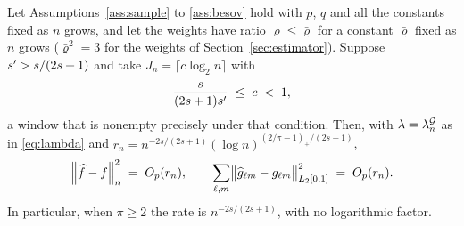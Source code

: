 \begin{theorem}
\label{thm:main}
Let Assumptions~\ref{ass:sample} to \ref{ass:besov} hold with $p$, $q$ and all
the constants fixed as $n$ grows, and let the weights have ratio
$\varrho \le \bar\varrho$ for a constant $\bar\varrho$ fixed as $n$ grows
($\bar\varrho^{2} = 3$ for the weights of Section~\ref{sec:estimator}). Suppose
$s' > s/(2s+1)$ and take $J_n = \lceil c \log_2 n\rceil$ with
\begin{equation}
  \label{eq:window}
  \frac{s}{(2s+1)s'} \;\le\; c \;<\; 1 ,
\end{equation}
a window that is nonempty precisely under that condition. Then, with
$\lambda = \lambda^{\mathcal{G}}_{n}$ as in \eqref{eq:lambda} and
$r_n = n^{-2s/(2s+1)}(\log n)^{(2/\pi-1)_{+}/(2s+1)}$,
\[
  \left\lVert \widehat{f}-f \right\rVert_{n}^{2} \;=\; O_p(r_n),
  \qquad
  \sum_{\ell,m}\bigl\lVert \widehat{g}_{\ell m}-g_{\ell m}
  \bigr\rVert_{L_2[0,1]}^{2} \;=\; O_p(r_n) .
\]
In particular, when $\pi \ge 2$ the rate is $n^{-2s/(2s+1)}$, with no
logarithmic factor.
\end{theorem}


